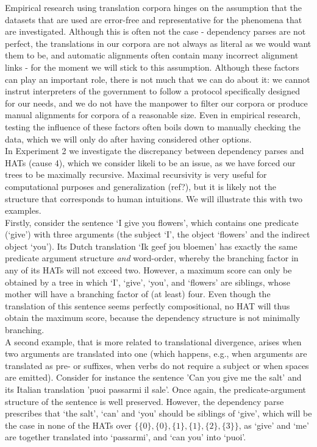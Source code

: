 \documentclass[a4paper, 11pt]{report}
\theoremstyle{definition}
\theoremstyle{plain}
\begin{document}
Empirical research using translation corpora hinges on the assumption that the datasets that are used are error-free and representative for the phenomena that are investigated. Although this is often not the case - dependency parses are not perfect, the translations in our corpora are not always as literal as we would want them to be, and automatic alignments often contain many incorrect alignment links - for the moment we will stick to this assumption. Although these factors can play an important role, there is not much that we can do about it: we cannot instrut interpreters of the government to follow a protocol specifically designed for our needs, and we do not have the manpower to filter our corpora or produce manual alignments for corpora of a reasonable size. Even in empirical research, testing the influence of these factors often boils down to manually checking the data, which we will only do after having considered other options.\\
In Experiment 2 we investigate the discrepancy between dependency parses and HATs (cause 4), which we consider likeli to be an issue, as we have forced our trees to be maximally recursive. Maximal recursivity is very useful for computational purposes and generalization (ref?), but it is likely not the structure that corresponds to human intuitions. We will illustrate this with two examples.\\ 
Firstly, consider the sentence `I give you flowers', which contains one predicate (`give') with three arguments (the subject `I', the object `flowers' and the indirect object `you'). Its Dutch translation `Ik geef jou bloemen' has exactly the same predicate argument structure \textit{and} word-order, whereby the branching factor in any of its HATs will not exceed two. However, a maximum score can only be obtained by a tree in which `I', `give', `you', and `flowers' are siblings, whose mother will have a branching factor of (at least) four. Even though the translation of this sentence seems perfectly compositional, no HAT will thus obtain the maximum score, because the dependency structure is not minimally branching.\\
A second example, that is more related to translational divergence, arises when two arguments are translated into one (which happens, e.g., when arguments are translated as pre- or suffixes, when verbs do not require a subject or when spaces are emitted). Consider for instance the sentence 'Can you give me the salt' and its Italian translation 'puoi passarmi il sale'. Once again, the predicate-argument structure of the sentence is well preserved. However, the dependency parse prescribes that `the salt', `can' and `you' should be siblings of `give', which will be the case in none of the HATs over $\{\{0\},\{0\},\{1\},\{1\},\{2\},\{3\}\}$, as `give' and `me' are together translated into `passarmi', and `can you' into `puoi'.\\
\end{document}
